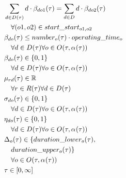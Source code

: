 \begin{alignat}{2}
	& \sum_{d \in D_{}(\tau)} d \cdot \beta_{do1}(\tau) = \sum_{d \in D} d \cdot \beta_{do2}(\tau)  \notag                               \\ 
	& \quad \forall (o1, o2) \in start\_start_{o1, o2}                                                       \\ 
	& \beta_{do}(\tau) \leq number_{o}(\tau) \cdot operating\_time_{o} \notag                                                     \\ 
	& \quad \forall d \in D_{}(\tau) \forall o \in O_{}(\tau, \alpha_{}(\tau) )                                                                  \\
	& \beta_{do}(\tau) \in \{0, 1\} \quad \notag\\
	& \quad \forall d \in D_{}(\tau) \forall o \in O_{}(\tau, \alpha_{}(\tau) )                                         \\
	& \mu_{rd}(\tau) \in \mathbb{R} \quad\notag\\
	& \quad  \forall r \in R(\tau) \forall d \in D_{}(\tau)                                        \\
	& \sigma_{do}(\tau) \in \{0, 1\}\quad \notag\\
	& \quad \forall d \in D_{}(\tau) \forall o \in O_{}(\tau, \alpha_{}(\tau) ) \\
	& \eta_{do}(\tau) \in \{0, 1\}\quad \notag\\
	& \quad \forall d \in D_{}(\tau) \forall o \in O_{}(\tau, \alpha_{}(\tau) ) \\
	& \Delta_{o}(\tau) \in \{ duration\_lower_{o}(\tau), \notag\\
	& \quad duration\_upper_{o}(\tau) \} \notag\\
	& \quad \forall o \in O_{}(\tau, \alpha_{}(\tau) )                                      \\
	& \tau \in  [0, \infty] 
\end{alignat}

